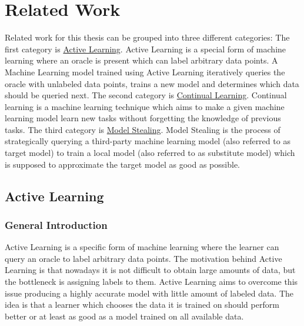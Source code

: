 
\chapter{Related Work}
\label{ch:Related_work}
Related work for this thesis can be grouped into three different categories:
The first category is \href{sec:Related_work:Active_Learning}{Active Learning}.
Active Learning is a special form of machine learning where an oracle is present
which can label arbitrary data points. A Machine Learning model trained using Active
Learning iteratively queries the oracle with unlabeled data points, trains a new model
and determines which data should be queried next. The second category is
\href{sec:Related_work:Continual_Learning}{Continual Learning}. Continual learning is a
machine learning technique which aims to make a given machine learning model learn new tasks
without forgetting the knowledge of previous tasks. 
The third category is \href{sec:Related_work:Model_Stealing}{Model Stealing}. Model Stealing is the
process of strategically querying a third-party machine learning model (also referred to as target model)
to train a local model (also referred to as substitute model) which is supposed to approximate the target model as
good as possible.

\section{Active Learning}
\label{sec:Related_work:Active_Learning}
\subsection{General Introduction}
Active Learning is a specific form of machine learning where the learner can query an oracle to label arbitrary data points.
The motivation behind Active Learning is that nowadays it is not difficult to obtain large amounts of data, but the bottleneck
is assigning labels to them. Active Learning aims to overcome this issue producing a highly accurate model with little amount
 of labeled data. The idea is that a learner which chooses the data it is trained on should perform better or at least as good
 as a model trained on all available data.
